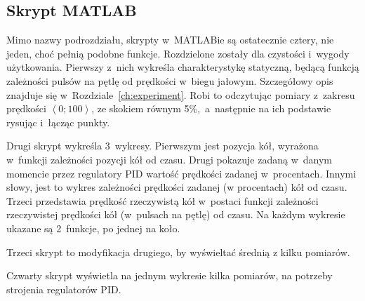 \subsection*{Skrypt MATLAB}
Mimo nazwy podrozdziału, skrypty w~MATLABie są ostatecznie cztery, nie jeden, choć pełnią podobne funkcje. Rozdzielone zostały dla czystości i~wygody użytkowania. Pierwszy z~nich wykreśla charakterystykę statyczną, będącą funkcją zależności pulsów na pętlę od prędkości w~biegu jałowym. Szczegółowy opis znajduje się w~Rozdziale~\ref{ch:experiment}. Robi to odczytując pomiary z~zakresu prędkości $\left<0; 100\right>$, ze skokiem równym 5\%,~a~następnie na ich podstawie rysując i~łącząc punkty.

Drugi skrypt wykreśla 3~wykresy. Pierwszym jest pozycja kół, wyrażona w~funkcji zależności pozycji kół od czasu. Drugi pokazuje zadaną w~danym momencie przez regulatory PID wartość prędkości zadanej w~procentach. Innymi słowy, jest to wykres zależności prędkości zadanej (w procentach) kół od czasu. Trzeci przedstawia prędkość rzeczywistą kół w~postaci funkcji zależności rzeczywistej prędkości kół (w~pulsach na pętlę) od czasu. Na każdym wykresie ukazane są 2~funkcje, po jednej na koło.

Trzeci skrypt to modyfikacja drugiego, by wyświeltać średnią z kilku pomiarów.

Czwarty skrypt wyświetla na jednym wykresie kilka pomiarów, na potrzeby strojenia regulatorów PID.